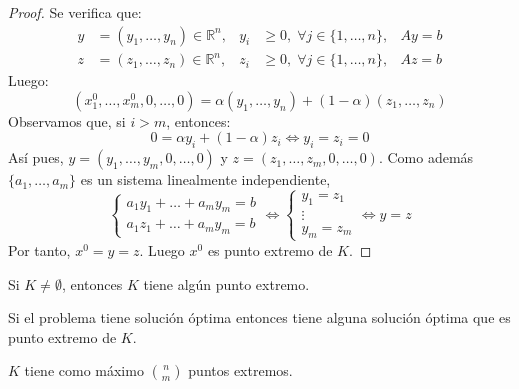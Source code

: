 \begin{proof}
    Se verifica que:
    \begin{align*}
        y & = (y_1, \dots, y_n) \in \mathbb{R}^n, & y_i & \geq 0, \; \forall j \in \{1, \dots, n\}, & Ay = b \\
        z & = (z_1, \dots, z_n) \in \mathbb{R}^n, & z_i & \geq 0, \; \forall j \in \{1, \dots, n\}, & Az = b
    \end{align*}
    Luego:
    $$(x^0_1, \dots, x^0_m, 0, \dots, 0) = \alpha(y_1, \dots, y_n) + (1-\alpha)(z_1, \dots, z_n)$$
    Observamos que, si $i > m$, entonces:
    $$0 = \alpha y_i + (1-\alpha)z_i \Leftrightarrow y_i = z_i = 0$$
    Así pues, $y = (y_1, \dots, y_m, 0, \dots, 0)$ y $z = (z_1, \dots, z_m, 0, \dots, 0)$.
    Como además $\{a_1, \dots, a_m\}$ es un sistema linealmente independiente,
    $$\begin{cases}
            a_1y_1 + \dots + a_my_m = b \\
            a_1z_1 + \dots + a_my_m = b
        \end{cases} \Leftrightarrow
        \begin{cases}
            y_1 = z_1 \\
            \vdots    \\
            y_m = z_m
        \end{cases} \Leftrightarrow y = z$$
    Por tanto, $x^0 = y = z$.
    Luego $x^0$ es punto extremo de $K$.
\end{proof}

\begin{corollary}
    Si $K \neq \emptyset$, entonces $K$ tiene algún punto extremo.
\end{corollary}

\begin{corollary}
    Si el problema tiene solución óptima entonces tiene alguna solución óptima que es punto extremo de $K$.
\end{corollary}

\begin{corollary}
    $K$ tiene como máximo $\binom{n}{m}$ puntos extremos.
\end{corollary}